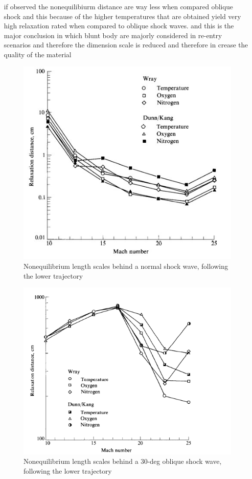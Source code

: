 if observed the nonequilibiurm distance are way less when compared oblique shock and this because of the higher temperatures that are obtained yield very high relaxation rated when compared to oblique shock waves.
and this is the major conclusion in which blunt body are majorly considered in re-entry scenarios and therefore the dimension scale is reduced and therefore in crease the quality of the material 
\begin{figure}[ht]

\centering
  \includegraphics[width=0.5\linewidth]{images/normal shock relaxation distance.jpg}
  \caption{Nonequilibrium length scales behind a normal shock wave, following the
lower trajectory }
  \label{fig:boat1}
\end{figure}

\begin{figure}[ht]

\centering
  \includegraphics[width=0.7\linewidth]{images/oblique shock relation distance.png}
  \caption{  Nonequilibrium length scales behind a 30-deg oblique shock wave,
following the lower trajectory}
  \label{fig:boat1}
\end{figure}